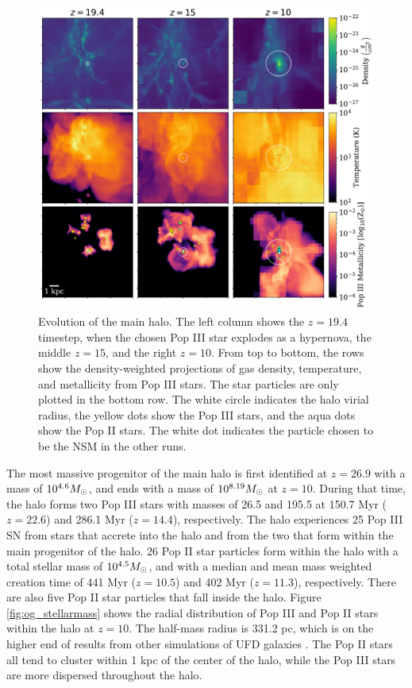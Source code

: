 \documentclass[fleqn,usenatbib]{mnras}
\begin{document}
\begin{figure} 
	\includegraphics[width=\textwidth]{plots/OG_evolution.pdf}
	\caption[Projections of the density, temperature and Pop III metallicity of the main halo through time.]{Evolution of the main halo. The left column shows the $z = 19.4$ timestep, when the chosen Pop III star explodes as a hypernova, the middle $z = 15$, and the right $z = 10$. From top to bottom, the rows show the density-weighted projections of gas density, temperature, and metallicity from Pop III stars. The star particles are only plotted in the bottom row. The white circle indicates the halo virial radius, the yellow dots show the Pop III stars, and the aqua dots show the Pop II stars. The white dot indicates the particle chosen to be the NSM in the other runs.}
	\label{fig:og_evolution}
\end{figure}

The most massive progenitor of the main halo is first identified at $z = 26.9$ with a mass of $10^{4.6} \Ms$, and ends with a mass of $10^{8.19} \Ms$ at $z = 10$. During that time, the halo forms two Pop III stars with masses of 26.5 \Ms{} and 195.5 \Ms{} at 150.7 Myr ($z = 22.6$) and 286.1 Myr ($z = 14.4$), respectively. The halo experiences 25 Pop III SN from stars that accrete into the halo and from the two that form within the main progenitor of the halo. 26 Pop II star particles form within the halo with a total stellar mass of $10^{4.5} \Ms$, and with a median and mean mass weighted creation time of 441 Myr ($z = 10.5$) and 402 Myr ($z = 11.3$), respectively. There are also five Pop II star particles that fall inside the halo. Figure \ref{fig:og_stellarmass} shows the radial distribution of Pop III and Pop II stars within the halo at $z = 10$. The half-mass radius is 331.2 pc, which is on the higher end of results from other simulations of UFD galaxies \citep{Ricotti16}. The Pop II stars all tend to cluster within 1 kpc of the center of the halo, while the Pop III stars are more dispersed throughout the halo. 
\end{document}
